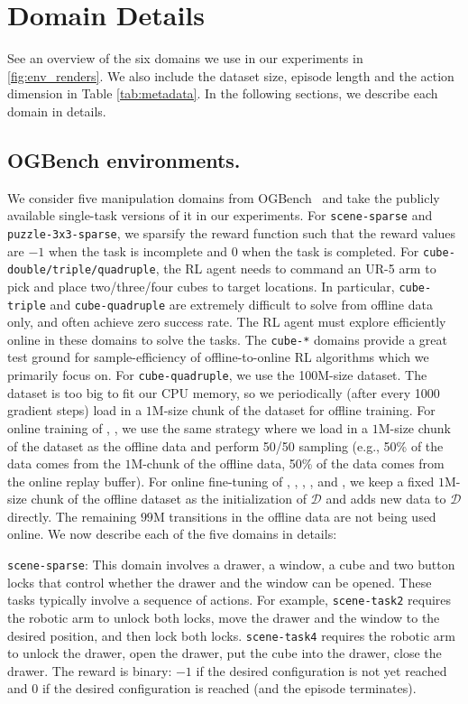 \appendix
\section{Domain Details}
\label{appendix:domain}
See an overview of the six domains we use in our experiments in \cref{fig:env_renders}. 
We also include the dataset size, episode length and the action dimension in Table \ref{tab:metadata}. In the following sections, we describe each domain in details.



\subsection{OGBench environments.} We consider five manipulation domains from OGBench~\citep{ogbench_park2024} and take the publicly available single-task versions of it in our experiments. For \texttt{scene-sparse} and \texttt{puzzle-3x3-sparse}, we sparsify the reward function such that the reward values are $-1$ when the task is incomplete and $0$ when the task is completed. For \texttt{cube-double/triple/quadruple}, the RL agent needs to command an UR-5 arm to pick and place two/three/four cubes to target locations. In particular, \texttt{cube-triple} and \texttt{cube-quadruple} are extremely difficult to solve from offline data only, and often achieve zero success rate. The RL agent must explore efficiently online in these domains to solve the tasks. The \texttt{cube-*} domains provide a great test ground for sample-efficiency of offline-to-online RL algorithms which we primarily focus on. For \texttt{cube-quadruple}, we use the 100M-size dataset. The dataset is too big to fit our CPU memory, so we periodically (after every 1000 gradient steps) load in a $1$M-size chunk of the dataset for offline training. For online training of , , we use the same strategy where we load in a $1$M-size chunk of the dataset as the offline data and perform 50/50 sampling (e.g., 50\% of the data comes from the $1$M-chunk of the offline data, 50\% of the data comes from the online replay buffer). For online fine-tuning of , , , , and , we keep a fixed $1$M-size chunk of the offline dataset as the initialization of $\mathcal{D}$ and adds new data to $\mathcal{D}$ directly. The remaining $99$M transitions in the offline data are not being used online. We now describe each of the five domains in details:

\texttt{scene-sparse}: This domain involves a drawer, a window, a cube and two button locks that control whether the drawer and the window can be opened. These tasks typically involve a sequence of actions. For example, \texttt{scene-task2} requires the robotic arm to unlock both locks, move the drawer and the window to the desired position, and then lock both locks. \texttt{scene-task4} requires the robotic arm to unlock the drawer, open the drawer, put the cube into the drawer, close the drawer. The reward is binary: $-1$ if the desired configuration is not yet reached and $0$ if the desired configuration is reached (and the episode terminates).

